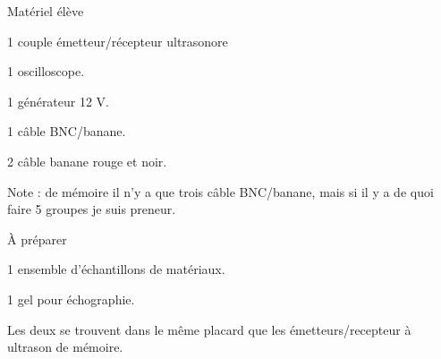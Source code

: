 
\begin{boiteMateriel}{Matériel élève}

  \begin{listePoints}
    \item 1 couple émetteur/récepteur ultrasonore
    \item 1 oscilloscope.
    \item 1 générateur 12 V.
    \item 1 câble BNC/banane.
    \item 2 câble banane rouge et noir.
  \end{listePoints}
  Note : de mémoire il n'y a que trois câble BNC/banane, mais si il y a de quoi faire 5 groupes je suis preneur.
\end{boiteMateriel}

\begin{boiteMateriel}{À préparer}
  \begin{listePoints}
    \item 1 ensemble d'échantillons de matériaux.
    \item 1 gel pour échographie.
  \end{listePoints}
  Les deux se trouvent dans le même placard que les émetteurs/recepteur à ultrason de mémoire.
\end{boiteMateriel}